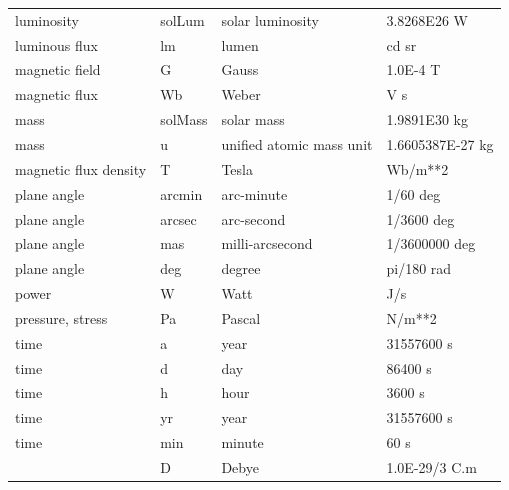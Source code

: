\documentclass[twoside,11pt]{article}
\begin{document}
\begin{table}[htbp]
\begin{center}
\begin{tabular}{|l|l|l|l|}
luminosity & solLum & solar luminosity & 3.8268E26 W \\
luminous flux & lm & lumen & cd sr \\
magnetic field & G & Gauss & 1.0E-4 T \\
magnetic flux & Wb & Weber & V s \\
mass & solMass & solar mass & 1.9891E30 kg \\
mass & u & unified atomic mass unit & 1.6605387E-27 kg \\
magnetic flux density & T & Tesla & Wb/m**2 \\
plane angle  & arcmin & arc-minute & 1/60 deg \\
plane angle  & arcsec & arc-second & 1/3600 deg \\
plane angle  & mas & milli-arcsecond & 1/3600000 deg \\
plane angle & deg & degree & pi/180 rad \\
power & W & Watt & J/s \\
pressure, stress & Pa & Pascal & N/m**2 \\
time  & a & year & 31557600 s \\
time  & d & day & 86400 s \\
time  & h & hour & 3600 s \\
time  & yr & year & 31557600 s \\
time  & min & minute & 60 s \\
      & D & Debye & 1.0E-29/3 C.m \\
\hline
\end{tabular}
\end{center}
\end{table}
\end{document}
